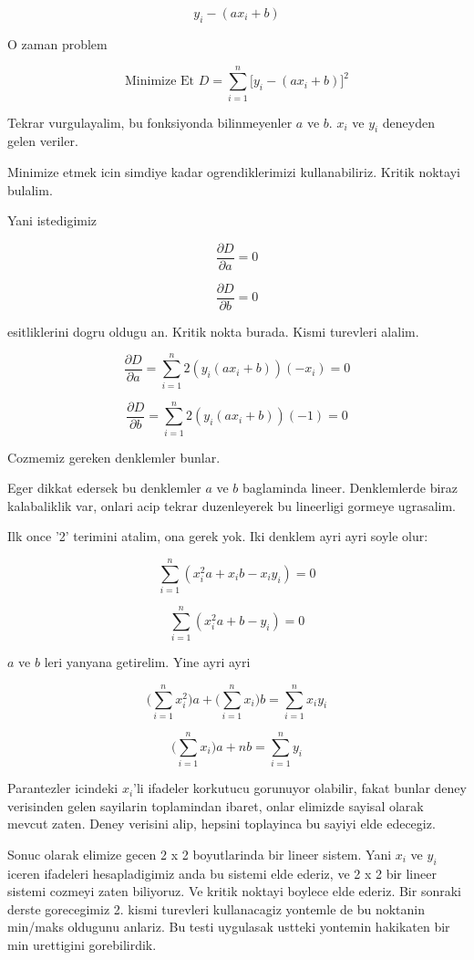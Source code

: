 \documentclass[12pt,fleqn]{article}\usepackage{../common}
\begin{document}
\[ y_i - (ax_i + b) \]

O zaman problem

\[ \textrm{Minimize Et } D = \sum_{i=1}^n \bigg[ y_i - (ax_i+b) \bigg]^2 \]

Tekrar vurgulayalim, bu fonksiyonda bilinmeyenler $a$ ve $b$. $x_i$ ve
$y_i$ deneyden gelen veriler. 

Minimize etmek icin simdiye kadar ogrendiklerimizi kullanabiliriz. Kritik
noktayi bulalim. 

Yani istedigimiz 

\[ \frac{\partial D}{\partial a} =0 \]

\[ \frac{\partial D}{\partial b} =0 \]

esitliklerini dogru oldugu an. Kritik nokta burada. Kismi turevleri alalim.

\[ \frac{\partial D}{\partial a}  =
\sum_{i=1}^n 2 (y_i (ax_i+b)) (-x_i) 
= 0
 \]

\[ \frac{\partial D}{\partial b} = 
\sum_{i=1}^n 2 (y_i (ax_i+b)) (-1) 
=0 \]

Cozmemiz gereken denklemler bunlar. 

Eger dikkat edersek bu denklemler $a$ ve $b$ baglaminda
lineer. Denklemlerde biraz kalabaliklik var, onlari acip tekrar
duzenleyerek bu lineerligi gormeye ugrasalim. 

Ilk once '2' terimini atalim, ona gerek yok. Iki denklem ayri ayri soyle
olur:

\[ \sum_{i=1}^n (x_i^2a + x_ib - x_iy_i) = 0\]

\[ \sum_{i=1}^n (x_i^2a + b - y_i) = 0\]

$a$ ve $b$ leri yanyana getirelim. Yine ayri ayri

\[  \bigg(\sum_{i=1}^n x_i^2\bigg)a + \bigg(\sum_{i=1}^n x_i\bigg) b = \sum_{i=1}^n x_iy_i\]

\[  \bigg(\sum_{i=1}^n x_i\bigg)a + nb = \sum_{i=1}^n y_i \]

Parantezler icindeki $x_i$'li ifadeler korkutucu gorunuyor olabilir, fakat
bunlar deney verisinden gelen sayilarin toplamindan ibaret, onlar elimizde
sayisal olarak mevcut zaten. Deney verisini alip, hepsini toplayinca bu
sayiyi elde edecegiz. 

Sonuc olarak elimize gecen 2 x 2 boyutlarinda bir lineer sistem. Yani $x_i$
ve $y_i$ iceren ifadeleri hesapladigimiz anda bu sistemi elde ederiz, ve 2
x 2 bir lineer sistemi cozmeyi zaten biliyoruz. Ve kritik noktayi boylece
elde ederiz. Bir sonraki derste gorecegimiz 2. kismi turevleri kullanacagiz
yontemle de bu noktanin min/maks oldugunu anlariz. Bu testi uygulasak
ustteki yontemin hakikaten bir min urettigini gorebilirdik. 
\end{document}

